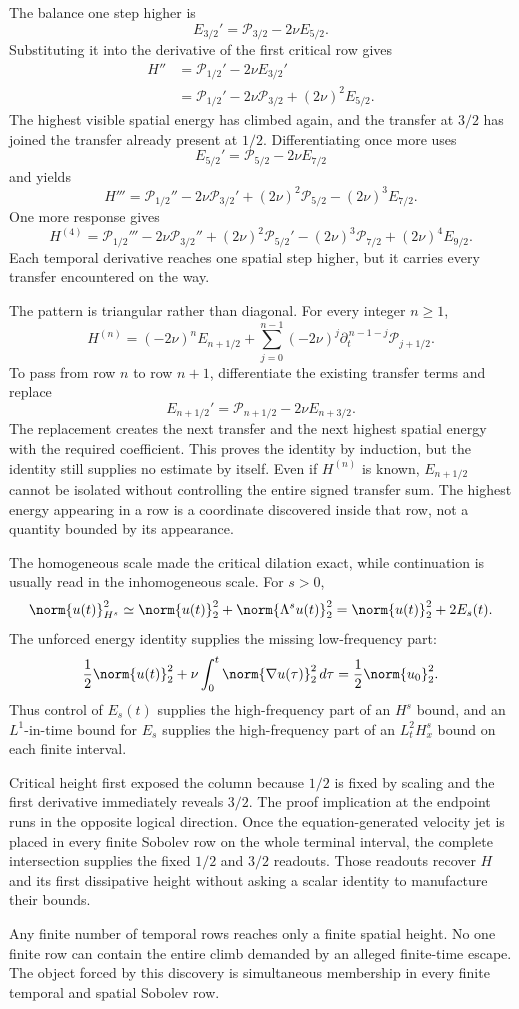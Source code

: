 The balance one step higher is
\[
  E_{3/2}'
  =
  \mathcal P_{3/2}-2\nu E_{5/2}.
\]
Substituting it into the derivative of the first critical row gives
\begin{align*}
  H''
  &=
  \mathcal P_{1/2}'-2\nu E_{3/2}'
  \\
  &=
  \mathcal P_{1/2}'
  -2\nu\mathcal P_{3/2}
  +(2\nu)^2E_{5/2}.
\end{align*}
The highest visible spatial energy has climbed again, and the transfer at \(3/2\) has joined the transfer already present at \(1/2\).
Differentiating once more uses
\[
  E_{5/2}'
  =
  \mathcal P_{5/2}-2\nu E_{7/2}
\]
and yields
\[
  H'''
  =
  \mathcal P_{1/2}''
  -2\nu\mathcal P_{3/2}'
  +(2\nu)^2\mathcal P_{5/2}
  -(2\nu)^3E_{7/2}.
\]
One more response gives
\[
  H^{(4)}
  =
  \mathcal P_{1/2}'''
  -2\nu\mathcal P_{3/2}''
  +(2\nu)^2\mathcal P_{5/2}'
  -(2\nu)^3\mathcal P_{7/2}
  +(2\nu)^4E_{9/2}.
\]
Each temporal derivative reaches one spatial step higher, but it carries every transfer encountered on the way.

The pattern is triangular rather than diagonal.
For every integer \(n\ge1\),
\[
  H^{(n)}
  =
  (-2\nu)^nE_{n+1/2}
  +
  \sum_{j=0}^{n-1}
  (-2\nu)^j
  \partial_t^{\,n-1-j}\mathcal P_{j+1/2}.
\]
To pass from row \(n\) to row \(n+1\), differentiate the existing transfer terms and replace
\[
  E_{n+1/2}'
  =
  \mathcal P_{n+1/2}-2\nu E_{n+3/2}.
\]
The replacement creates the next transfer and the next highest spatial energy with the required coefficient.
This proves the identity by induction, but the identity still supplies no estimate by itself.
Even if \(H^{(n)}\) is known, \(E_{n+1/2}\) cannot be isolated without controlling the entire signed transfer sum.
The highest energy appearing in a row is a coordinate discovered inside that row, not a quantity bounded by its appearance.

The homogeneous scale made the critical dilation exact, while continuation is usually read in the inhomogeneous scale.
For \(s>0\),
\[
  \norm{u(t)}_{H^s}^2
  \simeq
  \norm{u(t)}_2^2+\norm{\Lambda^su(t)}_2^2
  =
  \norm{u(t)}_2^2+2E_s(t).
\]
The unforced energy identity supplies the missing low-frequency part:
\[
  \frac12\norm{u(t)}_2^2
  +
  \nu\int_0^t\norm{\nabla u(\tau)}_2^2\,d\tau
  =
  \frac12\norm{u_0}_2^2.
\]
Thus control of \(E_s(t)\) supplies the high-frequency part of an \(H^s\) bound, and an \(L^1\)-in-time bound for \(E_s\) supplies the high-frequency part of an \(L^2_tH^s_x\) bound on each finite interval.

Critical height first exposed the column because \(1/2\) is fixed by scaling and the first derivative immediately reveals \(3/2\).
The proof implication at the endpoint runs in the opposite logical direction.
Once the equation-generated velocity jet is placed in every finite Sobolev row on the whole terminal interval, the complete intersection supplies the fixed \(1/2\) and \(3/2\) readouts.
Those readouts recover \(H\) and its first dissipative height without asking a scalar identity to manufacture their bounds.

Any finite number of temporal rows reaches only a finite spatial height.
No one finite row can contain the entire climb demanded by an alleged finite-time escape.
The object forced by this discovery is simultaneous membership in every finite temporal and spatial Sobolev row.

